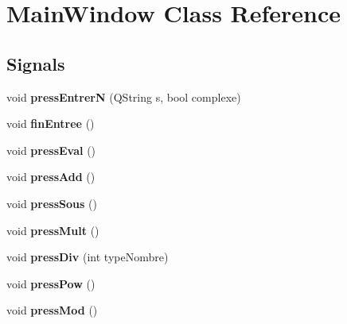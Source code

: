 \hypertarget{class_main_window}{\section{Main\-Window Class Reference}
\label{class_main_window}
}
\subsection*{Signals}
\begin{DoxyCompactItemize}
\item 
\hypertarget{class_main_window_ad223a3e425426fd76e3d40080096fc10}{void {\bfseries press\-Entrer\-N} (Q\-String s, bool complexe)}\label{class_main_window_ad223a3e425426fd76e3d40080096fc10}

\item 
\hypertarget{class_main_window_a7e430740aeaadb6d0d10514c979dab1a}{void {\bfseries fin\-Entree} ()}\label{class_main_window_a7e430740aeaadb6d0d10514c979dab1a}

\item 
\hypertarget{class_main_window_a95d2cfe9f1036d1dbbaad6d3f6504d1e}{void {\bfseries press\-Eval} ()}\label{class_main_window_a95d2cfe9f1036d1dbbaad6d3f6504d1e}

\item 
\hypertarget{class_main_window_a83561f536fad69bc32f1988a86ef2f34}{void {\bfseries press\-Add} ()}\label{class_main_window_a83561f536fad69bc32f1988a86ef2f34}

\item 
\hypertarget{class_main_window_adb6c880ba04d5cf65972767aa67abba6}{void {\bfseries press\-Sous} ()}\label{class_main_window_adb6c880ba04d5cf65972767aa67abba6}

\item 
\hypertarget{class_main_window_a2c25b8558b1c6dcd86a2a771bdd30310}{void {\bfseries press\-Mult} ()}\label{class_main_window_a2c25b8558b1c6dcd86a2a771bdd30310}

\item 
\hypertarget{class_main_window_a97a8062c748d81bbc5462dd3cecb150d}{void {\bfseries press\-Div} (int type\-Nombre)}\label{class_main_window_a97a8062c748d81bbc5462dd3cecb150d}

\item 
\hypertarget{class_main_window_a06c480034cf6c6a60e62c1da32bd3947}{void {\bfseries press\-Pow} ()}\label{class_main_window_a06c480034cf6c6a60e62c1da32bd3947}

\item 
\hypertarget{class_main_window_a5f63c4865d583d26ef3315c8b14945c1}{void {\bfseries press\-Mod} ()}\label{class_main_window_a5f63c4865d583d26ef3315c8b14945c1}


\end{DoxyCompactItemize}
